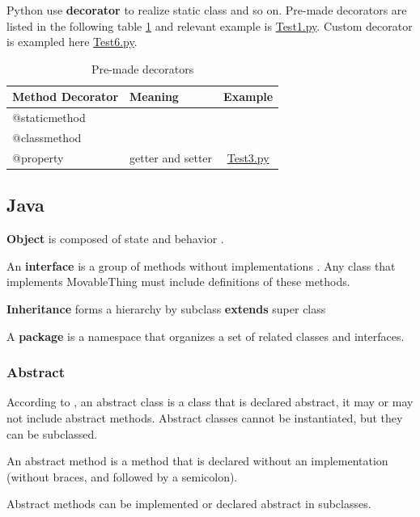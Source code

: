 \documentclass[12pt, a4paper]{report}
\begin{document}
		Python use \textbf{decorator} to realize static class and so on. Pre-made decorators are listed in the following table \ref{tab-decorator} and relevant example is \href{https://github.com/muerbingsha/compsumm/blob/master/learn/python/Test1.py}{Test1.py}. Custom decorator is exampled here \href{https://github.com/muerbingsha/compsumm/blob/master/learn/python/Test6.py}{Test6.py}. 
		\begin{table}[H]
		\centering
		\begin{tabular}{|l|l|c|}
		\toprule
		Method Decorator & Meaning & Example \\
		\toprule
		@staticmethod &  & \\
		\hline
		@classmethod & &  \\
		\hline
		@property & getter and setter & \href{https://github.com/muerbingsha/compsumm/blob/master/learn/python/Test3.py}{Test3.py} \\
		\bottomrule
		\end{tabular}
		\caption{Pre-made decorators}
		\label{tab-decorator}
		\end{table}
		
		
	\subsection{Java}
	    \textbf{Object} is composed of state and behavior \citep{object}.  \par 
	    An \textbf{interface} is a group of methods without implementations \citep{javaIntro}. Any class that implements MovableThing must include definitions of these methods. \par 
	    \textbf{Inheritance} forms a hierarchy by subclass \textbf{extends} super class\par 
	    A \textbf{package} is a namespace that organizes a set of related classes and interfaces. \par  
	    
	    \subsubsection{Abstract}
	    According to \citep{abstractClass}, an abstract class is a class that is declared abstract, it may or may not include abstract methods. Abstract classes cannot be instantiated, but they can be subclassed. \par 
	    An abstract method is a method that is declared without an implementation (without braces, and followed by a semicolon). \par 
	    Abstract methods can be implemented or declared abstract in subclasses. 
\end{document}
